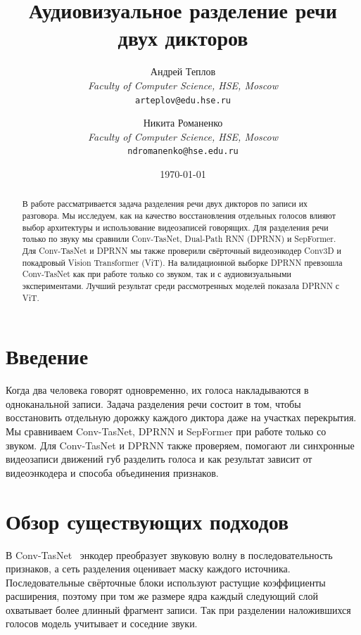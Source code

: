 \documentclass[10pt,conference,compsocconf]{IEEEtran}
\begin{document}
\title{Аудиовизуальное разделение речи двух дикторов}

\author{
  Андрей Теплов\\
  \textit{Faculty of Computer Science, HSE, Moscow}\\
  \texttt{arteplov@edu.hse.ru}
  \and
  Никита Романенко\\
  \textit{Faculty of Computer Science, HSE, Moscow}\\
  \texttt{ndromanenko@hse.edu.ru}
}

\date{\today}

\maketitle

\begin{abstract}
В работе рассматривается задача разделения речи двух дикторов по записи их разговора. Мы исследуем, как на качество восстановления отдельных голосов влияют выбор архитектуры и использование видеозаписей говорящих. Для разделения речи только по звуку мы сравнили Conv-TasNet, Dual-Path RNN (DPRNN) и SepFormer. Для Conv-TasNet и DPRNN мы также проверили свёрточный видеоэнкодер Conv3D и покадровый Vision Transformer (ViT). На валидационной выборке DPRNN превзошла Conv-TasNet как при работе только со звуком, так и с аудиовизуальными экспериментами. Лучший результат среди рассмотренных моделей показала DPRNN с ViT.
\end{abstract}

\section{Введение}\label{sec:introduction}

Когда два человека говорят одновременно, их голоса накладываются в одноканальной записи. Задача разделения речи состоит в том, чтобы восстановить отдельную дорожку каждого диктора даже на участках перекрытия. Мы сравниваем Conv-TasNet, DPRNN и SepFormer при работе только со звуком. Для Conv-TasNet и DPRNN также проверяем, помогают ли синхронные видеозаписи движений губ разделить голоса и как результат зависит от видеоэнкодера и способа объединения признаков.


\section{Обзор существующих подходов}\label{sec:related_work}

В Conv-TasNet~\cite{luo2019convtasnet} энкодер преобразует звуковую волну в последовательность признаков, а сеть разделения оценивает маску каждого источника. Последовательные свёрточные блоки используют растущие коэффициенты расширения, поэтому при том же размере ядра каждый следующий слой охватывает более длинный фрагмент записи. Так при разделении наложившихся голосов модель учитывает и соседние звуки.
\end{document}
